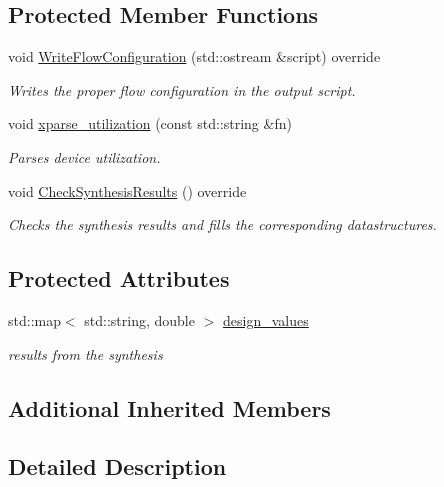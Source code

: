 \subsection*{Protected Member Functions}
\begin{DoxyCompactItemize}
\item 
void \hyperlink{classNanoXploreBackendFlow_a90dc6de670aa2eaf5b8dbc9daf7a1ba2}{Write\+Flow\+Configuration} (std\+::ostream \&script) override
\begin{DoxyCompactList}\small\item\em Writes the proper flow configuration in the output script. \end{DoxyCompactList}\item 
void \hyperlink{classNanoXploreBackendFlow_ac0920ff76e065f5a1879d7133be5f23f}{xparse\+\_\+utilization} (const std\+::string \&fn)
\begin{DoxyCompactList}\small\item\em Parses device utilization. \end{DoxyCompactList}\item 
void \hyperlink{classNanoXploreBackendFlow_ab62a47ac25b6bb973d3612feee8c14b3}{Check\+Synthesis\+Results} () override
\begin{DoxyCompactList}\small\item\em Checks the synthesis results and fills the corresponding datastructures. \end{DoxyCompactList}\end{DoxyCompactItemize}
\subsection*{Protected Attributes}
\begin{DoxyCompactItemize}
\item 
std\+::map$<$ std\+::string, double $>$ \hyperlink{classNanoXploreBackendFlow_a4c00247cba9ca992f1d601d0a6bd033f}{design\+\_\+values}
\begin{DoxyCompactList}\small\item\em results from the synthesis \end{DoxyCompactList}\end{DoxyCompactItemize}
\subsection*{Additional Inherited Members}


\subsection{Detailed Description}


